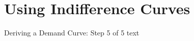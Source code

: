 \documentclass{beamer}
\begin{document}
\section{Using Indifference Curves}

\begin{frame}{Deriving a Demand Curve: Step 5 of 5}
text
\end{frame}
\end{document}
